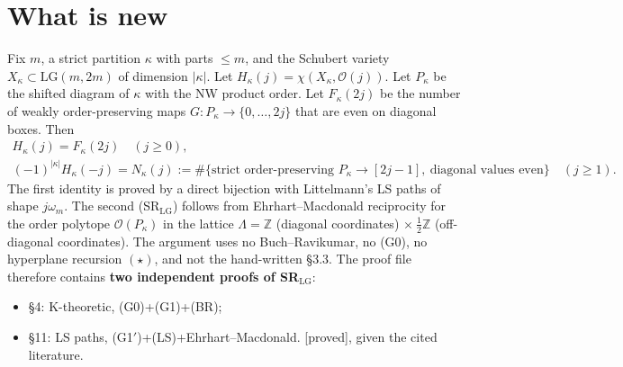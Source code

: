 \documentclass[10pt]{amsart}
\newcommand{\grade}[1]{\textsf{[#1]}}
\newcommand{\LG}{\mathrm{LG}}
\theoremstyle{remark}
\begin{document}
\section{What is new}
Fix $m$, a strict partition $\kappa$ with parts $\le m$, and the Schubert variety $X_\kappa\subset\LG(m,2m)$ of dimension $|\kappa|$.
Let $H_\kappa(j)=\chi(X_\kappa,\mathcal O(j))$. Let $P_\kappa$ be the shifted diagram of $\kappa$ with the NW product order.
Let $F_\kappa(2j)$ be the number of weakly order-preserving maps $G:P_\kappa\to\{0,\dots,2j\}$ that are even on diagonal boxes.
Then
\[
\begin{gathered}H_\kappa(j)=F_\kappa(2j)\quad(j\ge 0),\\ (-1)^{|\kappa|}H_\kappa(-j)=N_\kappa(j):=\#\{\text{strict order-preserving }P_\kappa\to[2j-1],\ \text{diagonal values even}\}\quad(j\ge1).\end{gathered}
\]
The first identity is proved by a direct bijection with Littelmann's LS paths of shape $j\omega_m$. The second (SR$_{\LG}$)
follows from Ehrhart--Macdonald reciprocity for the order polytope $\mathcal O(P_\kappa)$ in the lattice
$\Lambda=\mathbb Z$ (diagonal coordinates) $\times\ \tfrac12\mathbb Z$ (off-diagonal coordinates). The argument uses no
Buch--Ravikumar, no (G0), no hyperplane recursion $(\star)$, and not the hand-written \S3.3. The proof file therefore
contains \textbf{two independent proofs of SR$_{\LG}$}:
\begin{itemize}
\item \S4: K-theoretic, (G0)+(G1)+(BR);
\item \S11: LS paths, (G1$'$)+(LS)+Ehrhart--Macdonald. \grade{proved}, given the cited literature.
\end{itemize}
\end{document}
